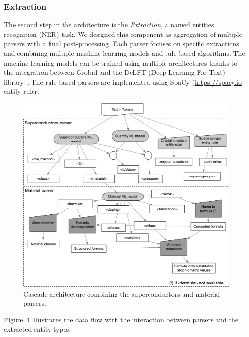 \documentclass{article}
\begin{document}
\subsubsection{Extraction}

The second step in the architecture is the \textit{Extraction}, a named entities recognition (NER) task.
We designed this component as aggregation of multiple parsers with a final post-processing. Each parser focuses on specific extractions and combining multiple machine learning models and rule-based algorithms.
The machine learning models can be trained using multiple architectures thanks to the integration between Grobid and the DeLFT (Deep Learning For Text) library~\cite{DeLFT}. 
The rule-based parsers are implemented using SpaCy (\url{https://spacy.io} entity ruler.

\begin{figure}[ht]
\label{fig:extraction-ml-models-cascade-architecture}
\includegraphics[width=\textwidth]{extraction-schema-2}
\caption{Cascade architecture combining the superconductors and material parsers.}
\end{figure}

Figure~\ref{fig:extraction-ml-models-cascade-architecture} illustrates the data flow with the interaction between parsers and the extracted entity types. 
\end{document}

